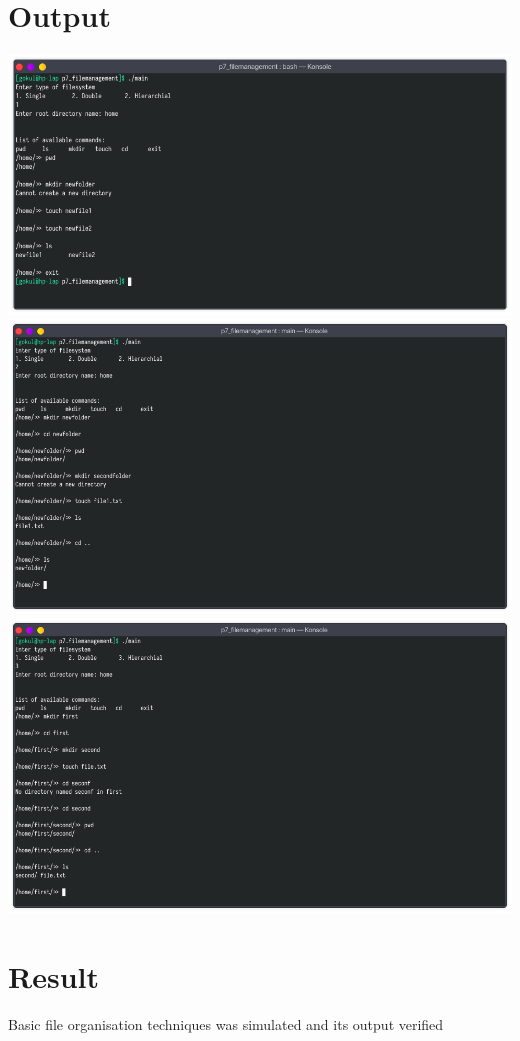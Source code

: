 \documentclass[13pt,oneside]{book}
\begin{document}
	\section*{Output}
	\includegraphics[width=\textwidth]{img/p7/ss1.png}
	\includegraphics[width=\textwidth]{img/p7/ss2.png}
	\includegraphics[width=\textwidth]{img/p7/ss3.png}
\Large
\section*{Result}
\large
Basic file organisation techniques was simulated and its output verified
								\newpage
\end{document}
